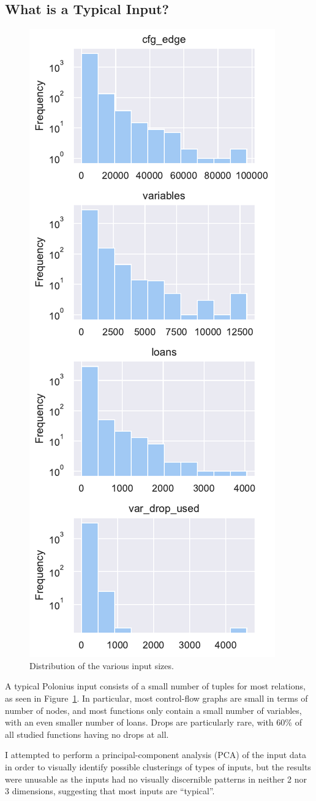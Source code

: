 \documentclass[11pt,a4paper,twoside,openany]{report}
\newcommand{\fixme}[1] {{\color{red}#1}}
\begin{document}
\subsection{What is a Typical Input?}\label{sec:inputs:inputs}

\begin{figure}
  \includegraphics[width=0.5\linewidth]{Graphs/input_sizes_dist.pdf}
  \caption{Distribution of the various input sizes.}
  \label{fig:input-sizes}
\end{figure}

A typical Polonius input consists of a small number of tuples for most
relations, as seen in Figure~\ref{fig:input-sizes}. In particular, most
control-flow graphs are small in terms of number of nodes, and most functions
only contain a small number of variables, with an even smaller number of loans.
Drops are particularly rare, with \fixme{60\% of all studied functions having no
  drops at all}.

I attempted to perform a principal-component analysis (PCA) of the input data in
order to visually identify possible clusterings of types of inputs, but the
results were unusable as the inputs had no visually discernible patterns in
neither 2 nor 3 dimensions, suggesting that most inputs are ``typical''.
\end{document}
